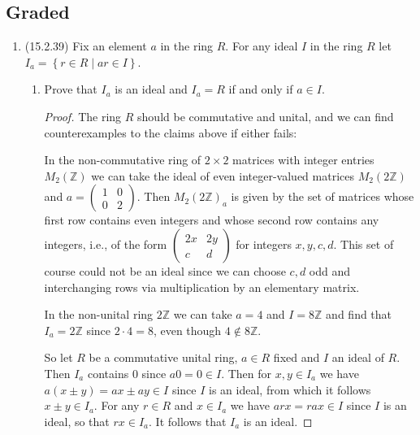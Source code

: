 \documentclass[11pt]{article}
\newcommand{\cbr}[1]{\left\{#1\right\}}
\begin{document}
\subsection*{Graded}
\begin{enumerate}
    \item (15.2.39) Fix an element $a$ in the ring $R$. For any ideal $I$ in the ring $R$ let $I_a= \cbr{r\in R\mid ar\in I}$.\begin{enumerate}
        \item Prove that $I_a$ is an ideal and $I_a=R$ if and only if $a\in I$. \begin{proof}
            The ring $R$ should be commutative and unital, and we can find counterexamples to the claims above if either fails:
            
            In the non-commutative ring of $2\times 2$ matrices with integer entries $M_{2}(\mathbb{Z})$ we can take the ideal of even integer-valued matrices $M_2(2\mathbb{Z})$ and $a = \begin{pmatrix}
                1 & 0 \\ 0 & 2
            \end{pmatrix}$. Then $M_2(2\mathbb{Z})_a$ is given by the set of matrices whose first row contains even integers and whose second row contains any integers, i.e., of the form $\begin{pmatrix}
                2x & 2y\\ c & d
            \end{pmatrix}$ for integers $x,y,c,d$. This set of course could not be an ideal since we can choose $c,d$ odd and interchanging rows via multiplication by an elementary matrix.

            In the non-unital ring $2\mathbb{Z}$ we can take $a = 4$ and $I = 8\mathbb{Z}$ and find that $I_a = 2\mathbb{Z}$ since $2\cdot 4 = 8$, even though $4\not\in 8\mathbb{Z}$.

            So let $R$ be a commutative unital ring, $a\in R$ fixed and $I$ an ideal of $R$. Then $I_a$ contains $0$ since $a0 =0\in I$. Then for $x,y\in I_a$ we have $a(x\pm y) = ax\pm ay\in I$ since $I$ is an ideal, from which it follows $x\pm y\in I_a$. For any $r\in R$ and $x\in I_a$ we have $arx =rax \in I$ since $I$ is an ideal, so that $rx\in I_a$. It follows that $I_a$ is an ideal.


\end{proof}
\end{enumerate}
\end{enumerate}
\end{document}
